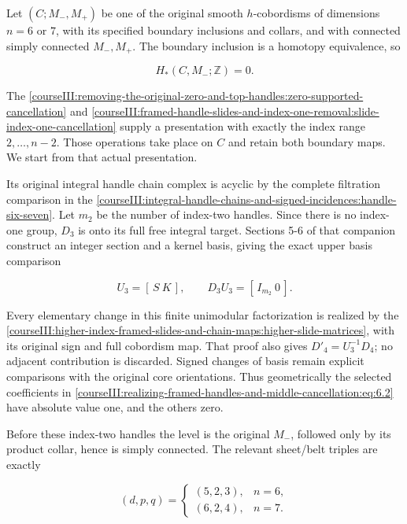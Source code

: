 Let \((C;M_-,M_+)\) be one of the original smooth \(h\)-cobordisms of dimensions \(n=6\) or \(7\), with its specified boundary inclusions and collars, and with connected simply connected \(M_-,M_+\). The boundary inclusion is a homotopy equivalence, so

\begin{equation}
H_*(C,M_-;\mathbb Z)=0.
 \label{courseIII:realizing-framed-handles-and-middle-cancellation:eq:6.1}
\end{equation}

The \cref{courseIII:removing-the-original-zero-and-top-handles:zero-supported-cancellation} and \cref{courseIII:framed-handle-slides-and-index-one-removal:slide-index-one-cancellation} supply a presentation with exactly the index range \(2,\ldots,n-2\). Those operations take place on \(C\) and retain both boundary maps. We start from that actual presentation.

Its original integral handle chain complex is acyclic by the complete filtration comparison in the \cref{courseIII:integral-handle-chains-and-signed-incidences:handle-six-seven}. Let \(m_2\) be the number of index-two handles. Since there is no index-one group, \(D_3\) is onto its full free integral target. Sections 5-6 of that companion construct an integer section and a kernel basis, giving the exact upper basis comparison

\begin{equation}
U_3=[\,S\ K\,],\qquad D_3U_3=[\,I_{m_2}\ 0\,].
 \label{courseIII:realizing-framed-handles-and-middle-cancellation:eq:6.2}
\end{equation}

Every elementary change in this finite unimodular factorization is realized by the \cref{courseIII:higher-index-framed-slides-and-chain-maps:higher-slide-matrices}, with its original sign and full cobordism map. That proof also gives \(D'_4=U_3^{-1}D_4\); no adjacent contribution is discarded. Signed changes of basis remain explicit comparisons with the original core orientations. Thus geometrically the selected coefficients in \eqref{courseIII:realizing-framed-handles-and-middle-cancellation:eq:6.2} have absolute value one, and the others zero.

Before these index-two handles the level is the original \(M_-\), followed only by its product collar, hence is simply connected. The relevant sheet/belt triples are exactly

\begin{equation}
(d,p,q)=
 \begin{cases}
 (5,2,3),&n=6,\\
 (6,2,4),&n=7.
 \end{cases}
 \label{courseIII:realizing-framed-handles-and-middle-cancellation:eq:6.3}
\end{equation}

